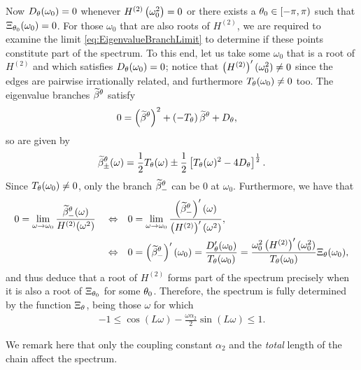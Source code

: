 Now $D_{\theta}(\omega_0)=0$ whenever $H^{(2)}\left( \omega_0^2 \right)=0$ or there exists a $\theta_0\in[-\pi,\pi)$ such that $\Xi_{\theta_0}(\omega_0)=0$.
For those $\omega_0$ that are also roots of $H^{(2)}$, we are required to examine the limit \eqref{eq:EigenvalueBranchLimit} to determine if these points constitute part of the spectrum.
To this end, let us take some $\omega_0$ that is a root of $H^{(2)}$ and which satisfies $D_{\theta}(\omega_0)=0$; notice that $\left( H^{(2)} \right)'(\omega_0^2)\neq 0$ since the edges are pairwise irrationally related, and furthermore $T_{\theta}(\omega_0)\neq0$ too.
The eigenvalue branches $\widetilde{\beta}^{\theta}$ satisfy
\begin{align*}
	0 &= \left( \widetilde{\beta}^{\theta} \right)^2 + \left( -T_{\theta} \right)\widetilde{\beta}^{\theta} + D_{\theta},
\end{align*}
so are given by
\begin{align*}
	\widetilde{\beta}_{\pm}^{\theta}(\omega) = \frac{1}{2}T_{\theta}(\omega) \pm \frac{1}{2}\left[ T_{\theta}(\omega)^2 - 4D_{\theta}  \right]^{\frac{1}{2}}.
\end{align*}
Since $T_{\theta}(\omega_0)\neq0$, only the branch $\widetilde{\beta}_{-}^{\theta}$ can be $0$ at $\omega_0$.
Furthermore, we have that
\begin{align*}
	0 = \lim_{\omega\rightarrow\omega_0} \frac{\widetilde{\beta}_{-}^{\theta}(\omega)}{H^{(2)}(\omega^2)}
	\quad\Leftrightarrow\quad &
	0 = \lim_{\omega\rightarrow\omega_0} \frac{\left( \widetilde{\beta}_{-}^{\theta} \right)'(\omega)}{\left( H^{(2)} \right)'(\omega^2)}, \\
	\quad\Leftrightarrow\quad &
	0 = \left( \widetilde{\beta}_{-}^{\theta} \right)'(\omega_0)
	= \frac{D'_{\theta}(\omega_0)}{T_{\theta}(\omega_0)}
	= \frac{\omega_0^2 \left( H^{(2)} \right)'(\omega_0^2)}{T_{\theta}(\omega_0)}\Xi_{\theta}(\omega_0),
\end{align*}
and thus deduce that a root of $H^{(2)}$ forms part of the spectrum precisely when it is also a root of $\Xi_{\theta_0}$ for some $\theta_0$.
Therefore, the spectrum is fully determined by the function $\Xi_{\theta}$, being those $\omega$ for which
\begin{align*}
	-1 \leq \cos(L\omega) - \frac{\omega\alpha_2}{2}\sin(L\omega) \leq 1.
\end{align*}

We remark here that only the coupling constant $\alpha_2$ and the \emph{total} length of the chain affect the spectrum.